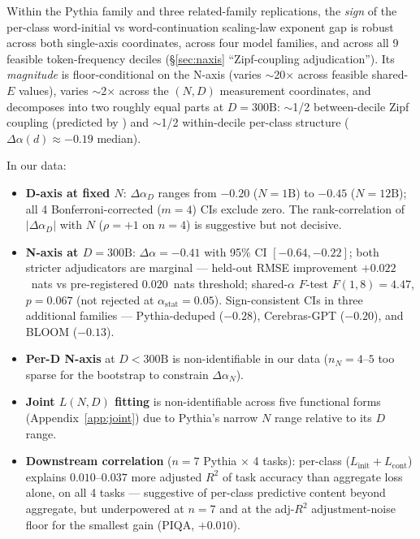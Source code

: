 \documentclass[10pt]{article}
\newcommand{\dalpha}{\Delta\alpha}
\newcommand{\Linit}{L_\mathrm{init}}
\newcommand{\Lcont}{L_\mathrm{cont}}
\begin{document}
Within the Pythia family and three related-family replications, the
\emph{sign} of the per-class word-initial vs word-continuation
scaling-law exponent gap is robust across both single-axis
coordinates, across four model families, and across all 9 feasible
token-frequency deciles (\S\ref{sec:naxis} ``Zipf-coupling
adjudication''). Its \emph{magnitude} is floor-conditional on the
N-axis (varies $\sim$20$\times$ across feasible shared-$E$ values),
varies $\sim$2$\times$ across the $(N, D)$ measurement coordinates,
and decomposes into two roughly equal parts at $D{=}300\text{B}$:
$\sim$1/2 between-decile Zipf coupling (predicted by
\citealp{michaud2023quantization}) and $\sim$1/2 within-decile
per-class structure ($\dalpha(d) \approx -0.19$ median).

In our data:
\begin{itemize}
  \item \textbf{D-axis at fixed $N$}: $\dalpha_D$ ranges from $-0.20$
        ($N{=}1\text{B}$) to $-0.45$ ($N{=}12\text{B}$); all 4
        Bonferroni-corrected ($m{=}4$) CIs exclude zero. The
        rank-correlation of $|\dalpha_D|$ with $N$ ($\rho{=}+1$ on
        $n{=}4$) is suggestive but not decisive.
  \item \textbf{N-axis at $D{=}300\text{B}$}: $\dalpha = -0.41$ with
        95\% CI $[-0.64, -0.22]$; both stricter adjudicators are
        marginal --- held-out RMSE improvement $+0.022$~nats vs
        pre-registered $0.020$~nats threshold; shared-$\alpha$
        $F$-test $F(1,8) = 4.47$, $p = 0.067$ (not rejected at
        $\alpha_\mathrm{stat} = 0.05$). Sign-consistent CIs in three
        additional families --- Pythia-deduped ($-0.28$),
        Cerebras-GPT ($-0.20$), and BLOOM ($-0.13$).
  \item \textbf{Per-D N-axis} at $D < 300\text{B}$ is non-identifiable
        in our data ($n_N = 4$--$5$ too sparse for the bootstrap to
        constrain $\dalpha_N$).
  \item \textbf{Joint $L(N, D)$ fitting} is non-identifiable across
        five functional forms (Appendix~\ref{app:joint}) due to
        Pythia's narrow $N$ range relative to its $D$ range.
  \item \textbf{Downstream correlation} ($n{=}7$ Pythia $\times$ 4
        tasks): per-class ($\Linit + \Lcont$) explains
        $0.010$--$0.037$ more adjusted $R^2$ of task accuracy than
        aggregate loss alone, on all 4 tasks --- suggestive of
        per-class predictive content beyond aggregate, but
        underpowered at $n{=}7$ and at the adj-$R^2$ adjustment-noise
        floor for the smallest gain (PIQA, $+0.010$).
\end{itemize}
\end{document}
